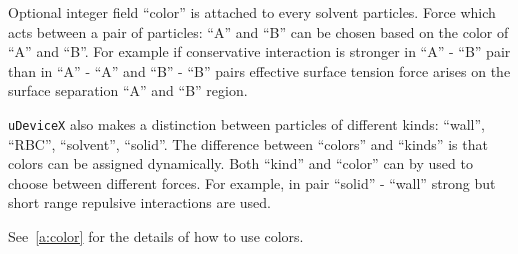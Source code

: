 Optional integer field ``color'' is attached to every solvent
particles. Force which acts between a pair of particles: ``A'' and
``B'' can be chosen based on the color of ``A'' and ``B''. For
example if conservative interaction is stronger in ``A'' - ``B'' pair
than in ``A'' - ``A'' and ``B'' - ``B'' pairs effective surface
tension force arises on the surface separation ``A'' and ``B''
region.

\texttt{uDeviceX} also makes a distinction between particles of different
kinds: ``wall'', ``RBC'', ``solvent'', ``solid''. The difference
between ``colors'' and ``kinds'' is that colors can be assigned
dynamically. Both ``kind'' and ``color'' can by used to choose between
different forces. For example, in pair ``solid'' - ``wall'' strong but
short range repulsive interactions are used.

See~\ref{a:color} for the details of how to use colors.
